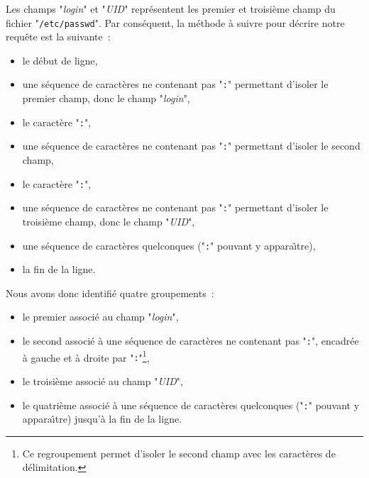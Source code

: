 Les champs "{\sl login}" et "{\sl UID}" repr{\'e}sentent les premier et 
troisi{\`e}me champ du fichier "{\tt /etc/passwd}". Par cons{\'e}quent, la m{\'e}thode
{\`a} suivre pour d{\'e}crire notre requ{\^e}te est la suivante~:
\begin{itemize}
	\item	le d{\'e}but de ligne,\\[2ex]
	\item	une s{\'e}quence de caract{\`e}res ne contenant pas "{\tt :}" permettant
			d'isoler le premier champ, donc le champ "{\sl login}",\\[2ex]
	\item	le caract{\`e}re "{\tt :}",\\[2ex]
	\item	une s{\'e}quence de caract{\`e}res ne contenant pas "{\tt :}" permettant
			d'isoler le second champ,\\[2ex]
	\item	le caract{\`e}re "{\tt :}",\\[2ex]
	\item	une s{\'e}quence de caract{\`e}res ne contenant pas "{\tt :}" permettant
			d'isoler le troisi{\`e}me  champ, donc le champ "{\sl UID}",\\[2ex]
	\item	une s{\'e}quence de caract{\`e}res quelconques ("{\tt :}" pouvant y
			appara{\^\i}tre),\\[2ex]
	\item	la fin de la ligne.
\end{itemize}
Nous avons donc identifi{\'e} quatre groupements~:
\begin{itemize}
	\item	le premier associ{\'e} au champ "{\sl login}",\\[2ex]
	\item	le second associ{\'e} {\`a} une s{\'e}quence de caract{\`e}res ne
			contenant pas "{\tt :}", encadr{\'e}e {\`a} gauche et {\`a} droite par
			"{\tt :}"\footnote{Ce regroupement permet d'isoler le second
			champ avec les caract{\`e}res de d{\'e}limitation.},\\[2ex]
	\item	le troisi{\`e}me associ{\'e} au champ "{\sl UID}",\\[2ex]
	\item	le quatri{\`e}me associ{\'e} {\`a} une s{\'e}quence de caract{\`e}res quelconques
			("{\tt :}" pouvant y appara{\^\i}tre) jusqu'{\`a} la fin de la ligne.
\end{itemize}

